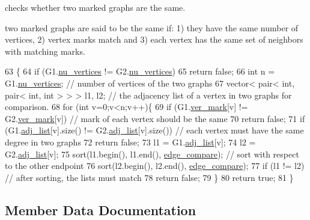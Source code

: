 checks whether two marked graphs are the same. 

two marked graphs are said to be the same if\+: 1) they have the same number of vertices, 2) vertex marks match and 3) each vertex has the same set of neighbors with matching marks. 
\begin{DoxyCode}
63 \{
64   \textcolor{keywordflow}{if} (G1.\hyperlink{classmarked__graph_acf79c6aeb8f32614cb14a5baaa6c9f9b}{nu\_vertices} != G2.\hyperlink{classmarked__graph_acf79c6aeb8f32614cb14a5baaa6c9f9b}{nu\_vertices})
65     \textcolor{keywordflow}{return} \textcolor{keyword}{false};
66   \textcolor{keywordtype}{int} n = G1.\hyperlink{classmarked__graph_acf79c6aeb8f32614cb14a5baaa6c9f9b}{nu\_vertices}; \textcolor{comment}{// number of vertices of the two graphs}
67   vector< pair< int, pair< int, int > > > l1, l2; \textcolor{comment}{// the adjacency list of a vertex in two graphs for
       comparison. }
68   \textcolor{keywordflow}{for} (\textcolor{keywordtype}{int} v=0;v<n;v++)\{
69     \textcolor{keywordflow}{if} (G1.\hyperlink{classmarked__graph_ac83e9377dd4d8bb95be1ac949b127296}{ver\_mark}[v] != G2.\hyperlink{classmarked__graph_ac83e9377dd4d8bb95be1ac949b127296}{ver\_mark}[v]) \textcolor{comment}{// mark of each vertex should be the same}
70       \textcolor{keywordflow}{return} \textcolor{keyword}{false};
71     \textcolor{keywordflow}{if} (G1.\hyperlink{classmarked__graph_a1a0bf7ca413a278763f7c878b3b6fd6f}{adj\_list}[v].size() != G2.\hyperlink{classmarked__graph_a1a0bf7ca413a278763f7c878b3b6fd6f}{adj\_list}[v].size()) \textcolor{comment}{// each vertex must have the same
       degree in two graphs}
72       \textcolor{keywordflow}{return} \textcolor{keyword}{false};
73     l1 = G1.\hyperlink{classmarked__graph_a1a0bf7ca413a278763f7c878b3b6fd6f}{adj\_list}[v];
74     l2 = G2.\hyperlink{classmarked__graph_a1a0bf7ca413a278763f7c878b3b6fd6f}{adj\_list}[v];
75     sort(l1.begin(), l1.end(), \hyperlink{marked__graph_8cpp_a09dd24caed50b1d106e10538e688b6ac}{edge\_compare}); \textcolor{comment}{// sort with respect to the other endpoint}
76     sort(l2.begin(), l2.end(), \hyperlink{marked__graph_8cpp_a09dd24caed50b1d106e10538e688b6ac}{edge\_compare});
77     \textcolor{keywordflow}{if} (l1 != l2) \textcolor{comment}{// after sorting, the lists must match}
78       \textcolor{keywordflow}{return} \textcolor{keyword}{false};
79   \}
80   \textcolor{keywordflow}{return} \textcolor{keyword}{true};
81 \}
\end{DoxyCode}


\subsection{Member Data Documentation}
\mbox{\label{classmarked__graph_a1a0bf7ca413a278763f7c878b3b6fd6f}} 
